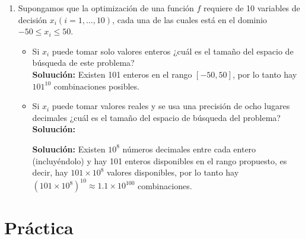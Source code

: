 \documentclass[10pt,letterpaper]{article}
\begin{document}
\begin{enumerate}
\begin{enumerate}
                \item Supongamos que la optimización de una función $f$ requiere de
                      10 variables de decisión $x_i(i = 1,...,10)$, cada una de las
                      cuales está en el dominio $-50 \leq x_i \leq 50$.
                      \begin{itemize}
                        \item Si $x_i$ puede tomar solo valores enteros ¿cuál
                              es el tamaño del espacio de búsqueda de este problema? \\

                              \textbf{Soluución:}
                              Existen 101 enteros en el rango $[-50, 50]$, por lo tanto
                              hay $101^{10}$ combinaciones posibles. \\

                        \item Si $x_i$ puede tomar valores reales y se usa
                              una precisión de ocho lugares decimales ¿cuál
                              es el tamaño del espacio de búsqueda del problema?
                              \textbf{Soluución:}

                              \textbf{Soluución:}
                              Existen $10^8$ números decimales entre cada entero
                              (incluyéndolo) y hay 101 enteros disponibles en el
                              rango propuesto, es decir, hay $101 \times 10^8$
                              valores disponibles, por lo tanto hay 
                              $(101 \times 10^8)^{10} \approx 1.1 \times 10^{100}$
                              combinaciones.
                      \end{itemize}
                      
            \end{enumerate}


    \end{enumerate}

\section{Práctica}
\end{document}

